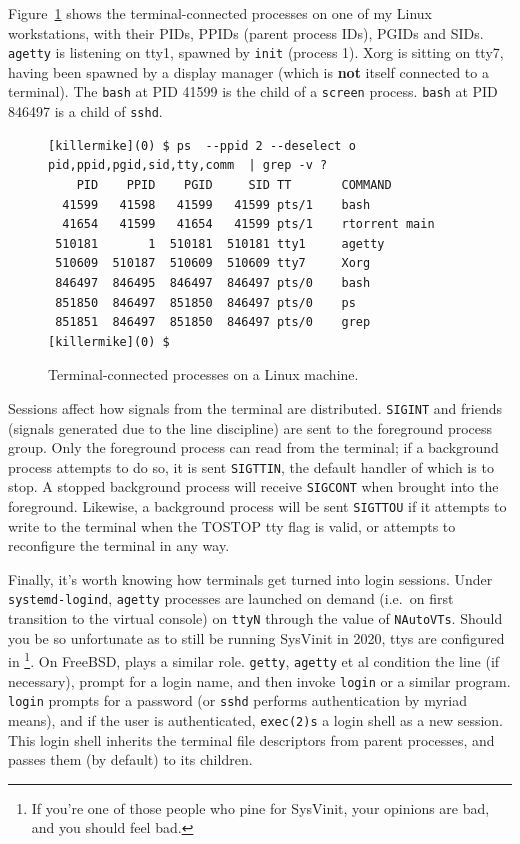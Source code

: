 Figure~\ref{fig:termprocs} shows the terminal-connected processes on one of
my Linux workstations, with their PIDs, PPIDs (parent process IDs), PGIDs
and SIDs. \texttt{agetty} is listening on tty1, spawned by
\texttt{init} (process 1). Xorg is sitting on tty7, having been spawned by a
display manager (which is \textbf{not} itself connected to a terminal). The
\texttt{bash} at PID 41599 is the child of a \texttt{screen} process.
\texttt{bash} at PID 846497 is a child of \texttt{sshd}.

\begin{figure}[!htb]
  \centering
\begin{verbatim}
[killermike](0) $ ps  --ppid 2 --deselect o pid,ppid,pgid,sid,tty,comm  | grep -v ?
    PID    PPID    PGID     SID TT       COMMAND
  41599   41598   41599   41599 pts/1    bash
  41654   41599   41654   41599 pts/1    rtorrent main
 510181       1  510181  510181 tty1     agetty
 510609  510187  510609  510609 tty7     Xorg
 846497  846495  846497  846497 pts/0    bash
 851850  846497  851850  846497 pts/0    ps
 851851  846497  851850  846497 pts/0    grep
[killermike](0) $
\end{verbatim}
\caption{Terminal-connected processes on a Linux machine.}
\label{fig:termprocs}
\end{figure}

Sessions affect how signals from the terminal are distributed. \texttt{SIGINT}
and friends (signals generated due to the line discipline) are sent to the
foreground process group. Only the foreground process can read from the
terminal; if a background process attempts to do so, it is sent \texttt{SIGTTIN}, the default
handler of which is to stop. A stopped background process will receive
\texttt{SIGCONT} when brought into the foreground. Likewise, a background
process will be sent \texttt{SIGTTOU} if it attempts to write to the terminal
when the TOSTOP tty flag is valid, or attempts to reconfigure the terminal in
any way\cite{sigterminals}.

Finally, it's worth knowing how terminals get turned into login sessions. Under
\texttt{systemd-logind}\cite{logind}, \texttt{agetty} processes are launched
on demand (i.e.\ on first transition to the virtual console) on \texttt{ttyN}
through the value of \texttt{NAutoVTs}. Should you be so unfortunate as to
still be running SysVinit in 2020, ttys are configured in \footnote{If you're one of those people who pine for SysVinit, your opinions are bad, and you should feel bad.}.
On FreeBSD,  plays a similar role\cite{fbsdttys5}. \texttt{getty},
\texttt{agetty} et al condition the line (if necessary), prompt for a login
name, and then invoke \texttt{login} or a similar program. \texttt{login} prompts
for a password (or \texttt{sshd} performs authentication by myriad means), and
if the user is authenticated, \texttt{exec(2)s} a login shell as a new session.
This login shell inherits the terminal file descriptors from parent processes,
and passes them (by default) to its children.

